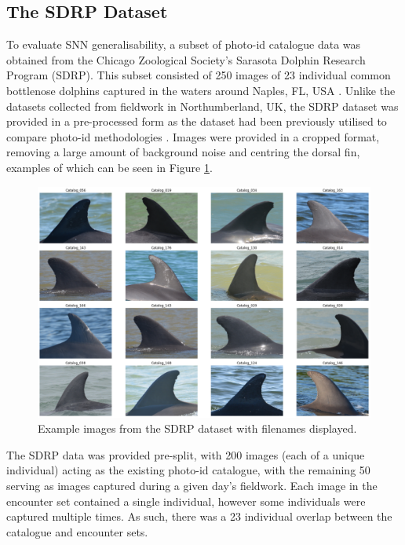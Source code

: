 \subsection{The SDRP Dataset}\label{ch:SNNEvaluation,sec:SDRP,sub:SDRPDataset}

To evaluate SNN generalisability, a subset of photo-id catalogue data was obtained from the Chicago Zoological Society's Sarasota Dolphin Research Program (SDRP). This subset consisted of 250 images of 23 individual common bottlenose dolphins captured in the waters around Naples, FL, USA \cite{tyson_moore_final_2020}. Unlike the datasets collected from fieldwork in Northumberland, UK, the SDRP dataset was provided in a pre-processed form as the dataset had been previously utilised to compare photo-id methodologies \cite{tyson_moore_rise_2022}. Images were provided in a cropped format, removing a large amount of background noise and centring the dorsal fin, examples of which can be seen in Figure \ref{fig:sdrp-example}. 

\begin{figure}
	\begin{center}
		\includegraphics[scale=0.3]{Chapter6/figs/SDRP_egs_tiled.png}
	\end{center}
	\caption{Example images from the SDRP dataset with filenames displayed.}
	\label{fig:sdrp-example}
\end{figure}

The SDRP data was provided pre-split, with 200 images (each of a unique individual) acting as the existing photo-id catalogue, with the remaining 50 serving as images captured during a given day's fieldwork. Each image in the encounter set contained a single individual, however some individuals were captured multiple times. As such, there was a 23 individual overlap between the catalogue and encounter sets. 

